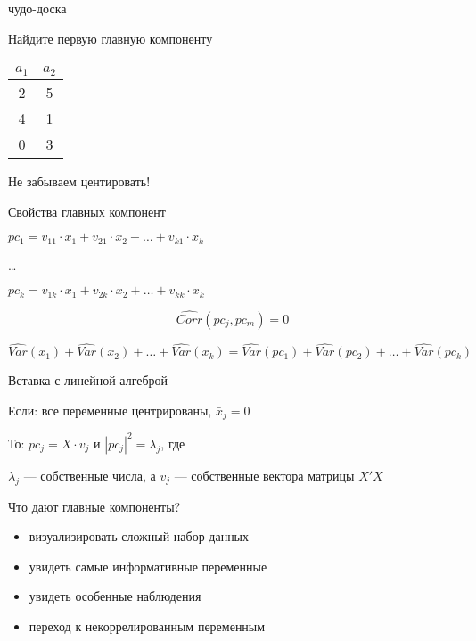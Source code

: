 \documentclass[ignorenonframetext,]{beamer}
\begin{document}
\begin{frame}{чудо-доска}

Найдите первую главную компоненту

\begin{tabular}{cc}
$a_1$ & $a_2$ \\ 
\hline 
2 & 5 \\ 
4 & 1 \\ 
0 & 3 \\ 
\end{tabular}

Не забываем центировать!

\end{frame}

\begin{frame}{Свойства главных компонент}

\(pc_1=v_{11} \cdot x_1 + v_{21} \cdot x_2 + \ldots + v_{k1} \cdot x_k\)

\ldots{}

\(pc_k=v_{1k} \cdot x_1 + v_{2k} \cdot x_2 + \ldots + v_{kk} \cdot x_k\)

\[
\widehat{Corr}(pc_j,pc_m)=0
\]

\[
\widehat{Var}(x_1)+ \widehat{Var}(x_2) + \ldots + \widehat{Var}(x_k) =
\widehat{Var}(pc_1)+ \widehat{Var}(pc_2) + \ldots + \widehat{Var}(pc_k)
\]

\end{frame}

\begin{frame}{Вставка с линейной алгеброй}

Если: все переменные центрированы, \(\bar{x}_j=0\)

То: \(pc_j=X \cdot v_j\) и \(|pc_j|^2=\lambda_j\), где

\(\lambda_j\) --- собственные числа, а \(v_{j}\) --- собственные вектора
матрицы \(X'X\)

\end{frame}

\begin{frame}{Что дают главные компоненты?}

\begin{itemize}
\itemsep1pt\parskip0pt
\item
  визуализировать сложный набор данных
\item
  увидеть самые информативные переменные
\item
  увидеть особенные наблюдения
\item
  переход к некоррелированным переменным
\end{itemize}

\end{frame}
\end{document}
